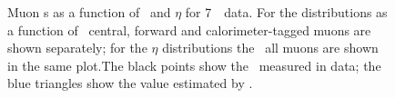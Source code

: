 \begin{figure}[h!]
\centering
\vspace{-8mm}
    \caption[Muon \FakeFactor s as a function of \pt\ and $\eta$ for 7~\tev\ data.]
    {Muon \FakeFactor s as a function of \pt\ and $\eta$ for 7~\tev\ data. 
    For the distributions as a function of \pt\, central, forward and calorimeter-tagged muons are shown
    separately; for the $\eta$ distributions the \ffactor\ all muons are
    shown in the same plot.The black points show the \ffactor\ measured in
    data; the blue triangles show the value estimated by \mc.}
\label{fig:ff-mu-seven} 
\end{figure}

